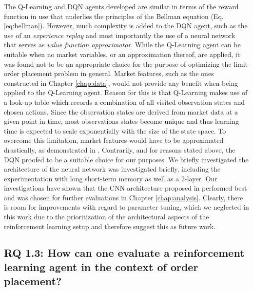     The Q-Learning and DQN agents developed are similar in terms of the reward function in use that underlies the principles of the Bellman equation (Eq. \ref{eq:bellman}).
    However, much complexity is added to the DQN agent, such as the use of an \textit{experience replay} and most importantly the use of a neural network that serves as \textit{value function approximator}.
    While the Q-Learning agent can be suitable when no market variables, or an approximation thereof, are applied, it was found not to be an appropriate choice for the purpose of optimizing the limit order placement problem in general.
    Market features, such as the ones constructed in Chapter \ref{chap:data}, would not provide any benefit when being applied to the Q-Learning agent.
    Reason for this is that Q-Learning makes use of a look-up table which records a combination of all visited observation states and chosen actions.
    Since the observation states are derived from market data at a given point in time, most observations states become unique and thus learning time is expected to scale exponentially with the size of the state space\cite{whitehead1991complexity}.
    To overcome this limitation, market features would have to be approximated drastically, as demonstrated in \cite{nevmyvaka2006reinforcement}.
    Contrarily, and for reasons stated above, the DQN proofed to be a suitable choice for our purposes.
    We briefly investigated the architecture of the neural network was investigated briefly, including the experimentation with long short-term memory\cite{gers1999learning} as well as a 2-layer.
    Our investigations have shown that the CNN architecture proposed in \cite{mnih2015human} performed best and was chosen for further evaluations in Chapter \ref{chap:analysis}.
    Clearly, there is room for improvements with regard to parameter tuning, which we neglected in this work due to the prioritization of the architectural aspects of the reinforcement learning setup and therefore suggest this as future work.

\subsection{RQ 1.3: How can one evaluate a reinforcement learning agent in the context of order placement?}

